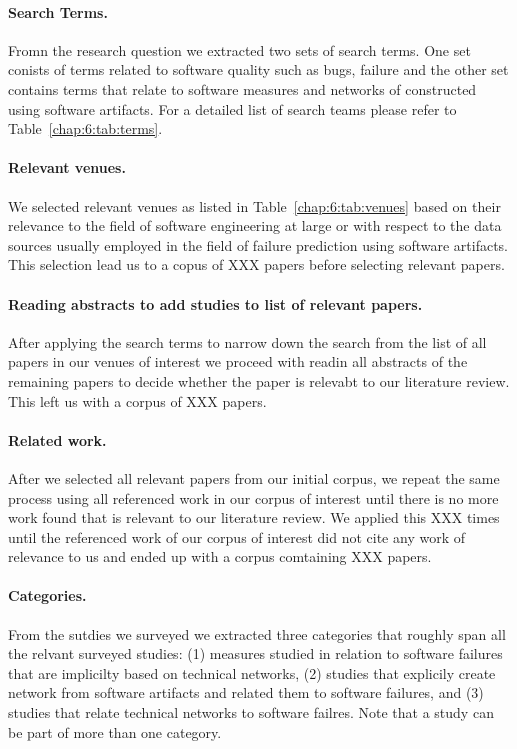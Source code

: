 \paragraph{Search Terms.} Fromn the research question we extracted two sets of search terms.
One set conists of terms related to software quality such as bugs, failure and the other set contains terms that relate to software measures and networks of constructed using software artifacts.
For a detailed list of search teams please refer to Table~\ref{chap:6:tab:terms}.

\paragraph{Relevant venues.} We selected relevant venues as listed in Table~\ref{chap:6:tab:venues} based on their relevance to the field of software engineering at large or with respect to the data sources usually employed in the field of failure prediction using software artifacts.
This selection lead us to a copus of XXX papers before selecting relevant papers.

\paragraph{Reading abstracts to add studies to list of relevant papers.} After applying the search terms to narrow down the search from the list of all papers in our venues of interest we proceed with readin all abstracts of the remaining papers to decide whether the paper is relevabt to our literature review.
This left us with a corpus of XXX papers.

\paragraph{Related work.} After we selected all relevant papers from our initial corpus, we repeat the same process using all referenced work in our corpus of interest until there is no more work found that is relevant to our literature review.
We applied this XXX times until the referenced work of our corpus of interest did not cite any work of relevance to us and ended up with a corpus comtaining XXX papers.

\paragraph{Categories.} From the sutdies we surveyed we extracted three categories that roughly span all the relvant surveyed studies:
(1) measures studied in relation to software failures that are implicilty based on technical networks,
(2) studies that explicily create network from software artifacts and related them to software failures,
and (3) studies that relate technical networks to software failres.
Note that a study can be part of more than one category.


